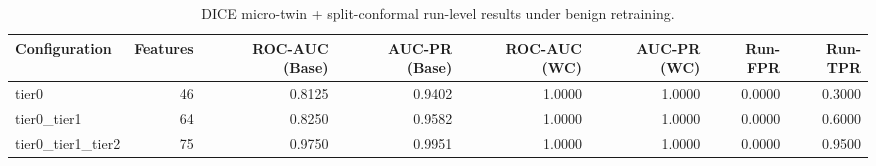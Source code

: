 \begin{table}[t]
\centering
\caption{DICE micro-twin + split-conformal run-level results under benign retraining.}
\label{tab:dice_full_overall}
\footnotesize
\begin{tabular}{lrrrrrrr}
\toprule
Configuration & Features & ROC-AUC (Base) & AUC-PR (Base) & ROC-AUC (WC) & AUC-PR (WC) & Run-FPR & Run-TPR \\
\midrule
tier0 & 46 & 0.8125 & 0.9402 & 1.0000 & 1.0000 & 0.0000 & 0.3000 \\
tier0_tier1 & 64 & 0.8250 & 0.9582 & 1.0000 & 1.0000 & 0.0000 & 0.6000 \\
tier0_tier1_tier2 & 75 & 0.9750 & 0.9951 & 1.0000 & 1.0000 & 0.0000 & 0.9500 \\
\bottomrule
\end{tabular}

\end{table}
